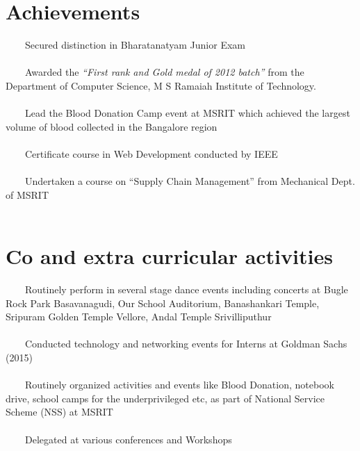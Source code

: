 \documentclass[a4paper,10pt]{article} %
\newcommand{\tabitem}{~~\llap{\textbullet}~~}
\begin{document}
\section{Achievements}
\tabitem Secured distinction in Bharatanatyam Junior Exam  \\
\\
\tabitem Awarded the \textit{“First rank and Gold medal of 2012 batch”} from the Department of Computer Science, M S Ramaiah Institute of Technology.\\
\\
\tabitem Lead the Blood Donation Camp event at MSRIT which achieved the largest volume of blood collected in the Bangalore region\\
\\
\tabitem Certificate course in Web Development conducted by IEEE \\
\\
\tabitem Undertaken a course on “Supply Chain Management” from Mechanical Dept. of MSRIT\\
\\


\section{Co and extra curricular activities}
\tabitem Routinely perform in several stage dance events including concerts at Bugle Rock Park Basavanagudi, Our School Auditorium, Banashankari Temple, Sripuram Golden Temple Vellore, Andal Temple Srivilliputhur\\
\\
\tabitem Conducted technology and networking events for Interns at Goldman Sachs (2015)\\
\\
\tabitem Routinely organized activities and events like Blood Donation, notebook drive, school camps for the underprivileged etc, as part of National Service Scheme (NSS) at MSRIT\\
\\ 
\tabitem Delegated at various conferences and Workshops\\
\\
\end{document}
